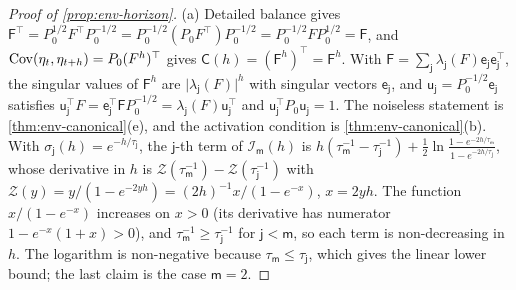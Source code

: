 \begin{proof}[Proof of \cref{prop:env-horizon}]
(a) Detailed balance gives $\mathsf F^\top=P_0^{1/2}F^\top P_0^{-1/2}=P_0^{-1/2}(P_0F^\top)P_0^{-1/2}=P_0^{-1/2}FP_0^{1/2}=\mathsf F$, and $\operatorname{Cov}(\eta_t,\eta_{t+h})=P_0(F^h)^\top$ gives $\mathsf C(h)=(\mathsf F^h)^\top=\mathsf F^h$. With $\mathsf F=\sum_{\mathsf j}\lambda_{\mathsf j}(F)\mathsf e_{\mathsf j}\mathsf e_{\mathsf j}^\top$, the singular values of $\mathsf F^h$ are $\lvert\lambda_{\mathsf j}(F)\rvert^h$ with singular vectors $\mathsf e_{\mathsf j}$, and $\mathsf u_{\mathsf j}=P_0^{-1/2}\mathsf e_{\mathsf j}$ satisfies $\mathsf u_{\mathsf j}^\top F=\mathsf e_{\mathsf j}^\top\mathsf FP_0^{-1/2}=\lambda_{\mathsf j}(F)\mathsf u_{\mathsf j}^\top$ and $\mathsf u_{\mathsf j}^\top P_0\mathsf u_{\mathsf j}=1$. The noiseless statement is \cref{thm:env-canonical}(e), and the activation condition is \cref{thm:env-canonical}(b). With $\sigma_{\mathsf j}(h)=e^{-h/\tau_{\mathsf j}}$, the $\mathsf j$-th term of $\mathcal I_{\mathsf m}(h)$ is $h(\tau_{\mathsf m}^{-1}-\tau_{\mathsf j}^{-1})+\frac12\ln\frac{1-e^{-2h/\tau_{\mathsf m}}}{1-e^{-2h/\tau_{\mathsf j}}}$, whose derivative in $h$ is $\mathcal Z(\tau_{\mathsf m}^{-1})-\mathcal Z(\tau_{\mathsf j}^{-1})$ with $\mathcal Z(y)=y/(1-e^{-2yh})=(2h)^{-1}x/(1-e^{-x})$, $x=2yh$. The function $x/(1-e^{-x})$ increases on $x>0$ (its derivative has numerator $1-e^{-x}(1+x)>0$), and $\tau_{\mathsf m}^{-1}\ge\tau_{\mathsf j}^{-1}$ for $\mathsf j<\mathsf m$, so each term is non-decreasing in $h$. The logarithm is non-negative because $\tau_{\mathsf m}\le\tau_{\mathsf j}$, which gives the linear lower bound; the last claim is the case $\mathsf m=2$.


\end{proof}
